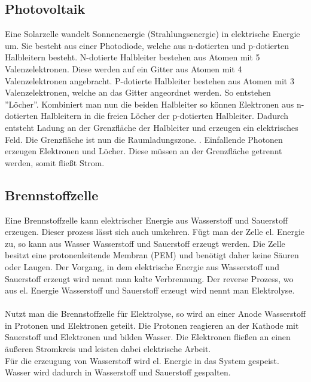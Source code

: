 \documentclass[12pt,a4paper,twoside]{article}
\begin{document}
\subsection{Photovoltaik}
Eine Solarzelle wandelt Sonnenenergie (Strahlungsenergie) in elektrische Energie um. Sie besteht aus einer Photodiode, welche aus n-dotierten und p-dotierten Halbleitern besteht. 
N-dotierte Halbleiter bestehen aus Atomen mit 5 Valenzelektronen. Diese werden auf ein Gitter aus Atomen mit 4 Valenzelektronen angebracht. 
P-dotierte Halbleiter bestehen aus Atomen mit 3 Valenzelektronen, welche an das Gitter angeordnet werden. So entstehen ''Löcher''. Kombiniert man nun die beiden Halbleiter so können Elektronen aus n-dotierten Halbleitern in die freien Löcher der p-dotierten Halbleiter. 
Dadurch entsteht Ladung an der Grenzfläche der Halbleiter und erzeugen ein elektrisches Feld. Die Grenzfläche ist nun die Raumladungszone. . 
Einfallende Photonen erzeugen Elektronen und Löcher. Diese müssen an der Grenzfläche getrennt werden, somit fließt Strom. 

\subsection{Brennstoffzelle}
Eine Brennstoffzelle kann elektrischer Energie aus Wasserstoff und Sauerstoff erzeugen. 
Dieser prozess lässt sich auch umkehren. Fügt man der Zelle el. Energie zu, so kann aus Wasser Wasserstoff und Sauerstoff erzeugt werden. 
Die Zelle besitzt eine protonenleitende Membran (PEM) und benötigt daher keine Säuren oder Laugen. 
Der Vorgang, in dem elektrische Energie aus Wasserstoff und Sauerstoff erzeugt wird nennt man kalte Verbrennung. Der reverse Prozess, wo aus el. Energie Wasserstoff und Sauerstoff erzeugt wird nennt man Elektrolyse. 
\\
\\ 
Nutzt man die Brennstoffzelle für Elektrolyse, so wird an einer Anode Wasserstoff in Protonen und Elektronen geteilt. Die Protonen reagieren an der Kathode mit Sauerstoff und Elektronen und bilden Wasser. Die Elektronen fließen an einen äußeren Stromkreis und leisten dabei elektrische Arbeit. 
\\
Für die erzeugung von Wasserstoff wird el. Energie in das System gespeist. Wasser wird dadurch in Wasserstoff und Sauerstoff gespalten. 
\end{document}
